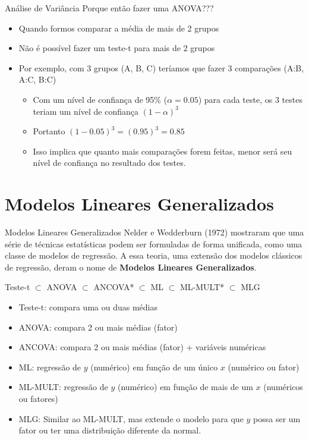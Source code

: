 \documentclass[10pt]{beamer}\usepackage[]{graphicx}\usepackage[]{color}
\theoremstyle{definition}
\begin{document}
\begin{frame}[fragile=singleslide]{Análise de Variância}
Porque então fazer uma ANOVA???
\begin{itemize}
\item Quando formos comparar a média de mais de 2 grupos
\item Não é possível fazer um teste-t para mais de 2 grupos
\item Por exemplo, com 3 grupos (A, B, C) teríamos que fazer 3
  comparações (A:B, A:C, B:C)
  \begin{itemize}
  \item Com um nível de confiança de 95\% ($\alpha = 0.05$)
    para cada teste, os 3 testes teriam um nível de confiança
    $(1-\alpha)^3$
  \item Portanto $(1-0.05)^3 = (0.95)^3 = 0.85$
  \item Isso implica que quanto mais comparações forem feitas, menor
    será seu nível de confiança no resultado dos testes.
  \end{itemize}
\end{itemize}
\end{frame}

\section[MLGs]{Modelos Lineares Generalizados}

\begin{frame}[fragile=singleslide]{Modelos Lineares Generalizados}
Nelder e Wedderburn (1972) mostraram que uma série de técnicas
estatísticas podem ser formuladas de forma unificada, como uma classe de
modelos de regressão. A essa teoria, uma extensão dos modelos clássicos
de regressão, deram o nome de \textbf{Modelos Lineares
  Generalizados}.
\begin{center}
  Teste-t $\subset$ ANOVA $\subset$ ANCOVA* $\subset$ ML $\subset$
  ML-MULT* $\subset$ MLG
\end{center}
  \begin{itemize}
  \item Teste-t: compara uma ou duas médias
  \item ANOVA: compara 2 ou mais médias (fator)
  \item ANCOVA: compara 2 ou mais médias (fator) + variáveis numéricas
  \item ML: regressão de $y$ (numérico) em função de um único $x$
    (numérico ou fator)
  \item ML-MULT: regressão de $y$ (numérico) em função de mais de um $x$
    (numéricos ou fatores)
  \item MLG: Similar ao ML-MULT, mas extende o modelo para que $y$ possa
    ser um fator ou ter uma distribuição diferente da normal.
  \end{itemize}
\end{frame}
\end{document}

